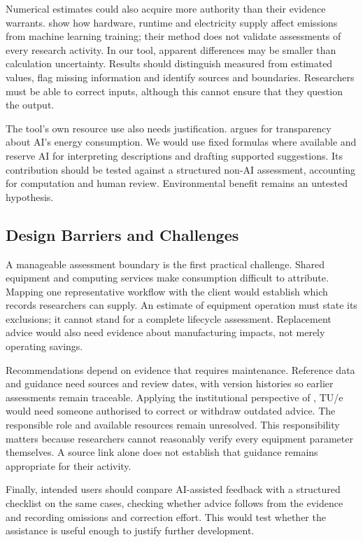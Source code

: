 \documentclass[11pt,a4paper]{article}
\begin{document}
Numerical estimates could also acquire more authority than their evidence warrants. \citet{lacoste2019carbon} show how hardware, runtime and electricity supply affect emissions from machine learning training; their method does not validate assessments of every research activity. In our tool, apparent differences may be smaller than calculation uncertainty. Results should distinguish measured from estimated values, flag missing information and identify sources and boundaries. Researchers must be able to correct inputs, although this cannot ensure that they question the output.

The tool's own resource use also needs justification. \citet{lin2023cost} argues for transparency about AI's energy consumption. We would use fixed formulas where available and reserve AI for interpreting descriptions and drafting supported suggestions. Its contribution should be tested against a structured non-AI assessment, accounting for computation and human review. Environmental benefit remains an untested hypothesis.

\subsection{Design Barriers and Challenges}

A manageable assessment boundary is the first practical challenge. Shared equipment and computing services make consumption difficult to attribute. Mapping one representative workflow with the client would establish which records researchers can supply. An estimate of equipment operation must state its exclusions; it cannot stand for a complete lifecycle assessment. Replacement advice would also need evidence about manufacturing impacts, not merely operating savings.

Recommendations depend on evidence that requires maintenance. Reference data and guidance need sources and review dates, with version histories so earlier assessments remain traceable. Applying the institutional perspective of \citet{hasselbalch2025sustainability}, TU/e would need someone authorised to correct or withdraw outdated advice. The responsible role and available resources remain unresolved. This responsibility matters because researchers cannot reasonably verify every equipment parameter themselves. A source link alone does not establish that guidance remains appropriate for their activity.

Finally, intended users should compare AI-assisted feedback with a structured checklist on the same cases, checking whether advice follows from the evidence and recording omissions and correction effort. This would test whether the assistance is useful enough to justify further development.
\end{document}
